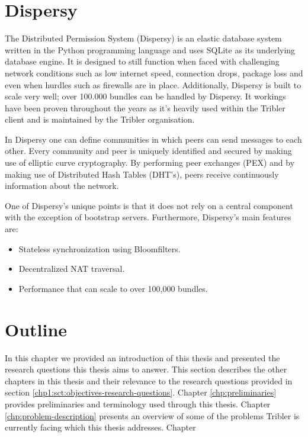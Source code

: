 \section{Dispersy}
The Distributed Permission System (Dispersy) is an elastic database system written in the Python programming language and uses SQLite as its underlying database engine.
It is designed to still function when faced with challenging network conditions such as low internet speed, connection drops, package loss and even when hurdles such as firewalls are in place.
Additionally, Dispersy is built to scale very well; over 100.000 bundles can be handled by Dispersy.
It workings have been proven throughout the years as it's heavily used within the Tribler client and is maintained by the Tribler organisation.

In Dispersy one can define communities in which peers can send messages to each other.
Every community and peer is uniquely identified and secured by making use of elliptic curve cryptography.
By performing peer exchanges (PEX) and by making use of Distributed Hash Tables (DHT's), peers receive continuously information about the network.

One of Dispersy's unique points is that it does not rely on a central component with the exception of bootstrap servers.
Furthermore, Dispersy's main features are:
\begin{itemize}
	\item Stateless synchronization using Bloomfilters.
	\item Decentralized NAT traversal.
	\item Performance that can scale to over 100,000 bundles.
\end{itemize}


\section{Outline}
In this chapter we provided an introduction of this thesis and presented the research questions this thesis aims to answer. 
This section describes the other chapters in this thesis and their relevance to the research questions provided in section \ref{chp1:sct:objectives-research-questions}.
Chapter \ref{chp:preliminaries} provides preliminaries and terminology used through this thesis.
Chapter \ref{chp:problem-description} presents an overview of some of the problems Tribler is currently facing which this thesis addresses.
Chapter 
